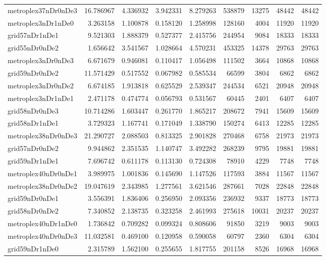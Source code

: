 \begin{longtable}{|l|r|r|r|r|r|r|r|r|}
metroplex37nDr0nDe3 & 16.786967 & 4.336932 & 3.942331 & 8.279263 & 538879 & 13275 & 48442 & 48442 \\
metroplex3nDr1nDe0 & 3.263158 & 1.100878 & 0.158120 & 1.258998 & 128160 & 4004 & 11920 & 11920 \\
grid57nDr1nDe1 & 9.521303 & 1.888379 & 0.527377 & 2.415756 & 244954 & 9084 & 18333 & 18333 \\
grid55nDr0nDe2 & 1.656642 & 3.541567 & 1.028664 & 4.570231 & 453325 & 14378 & 29763 & 29763 \\
metroplex3nDr0nDe3 & 6.671679 & 0.946081 & 0.110417 & 1.056498 & 111502 & 3664 & 10868 & 10868 \\
grid59nDr0nDe2 & 11.571429 & 0.517552 & 0.067982 & 0.585534 & 66599 & 3804 & 6862 & 6862 \\
metroplex3nDr0nDe2 & 6.674185 & 1.913818 & 0.625529 & 2.539347 & 244534 & 6521 & 20948 & 20948 \\
metroplex3nDr1nDe1 & 2.471178 & 0.474774 & 0.056793 & 0.531567 & 60445 & 2401 & 6407 & 6407 \\
grid58nDr0nDe3 & 10.714286 & 1.603447 & 0.261770 & 1.865217 & 208672 & 7941 & 15609 & 15609 \\
grid58nDr1nDe1 & 3.729323 & 1.167741 & 0.171049 & 1.338790 & 150274 & 6413 & 12285 & 12285 \\
metroplex38nDr0nDe3 & 21.290727 & 2.088503 & 0.813325 & 2.901828 & 270468 & 6758 & 21973 & 21973 \\
grid57nDr0nDe2 & 9.944862 & 2.351535 & 1.140747 & 3.492282 & 268239 & 9795 & 19881 & 19881 \\
grid59nDr1nDe1 & 7.696742 & 0.611178 & 0.113130 & 0.724308 & 78910 & 4229 & 7748 & 7748 \\
metroplex40nDr0nDe1 & 3.989975 & 1.001836 & 0.145690 & 1.147526 & 117593 & 3884 & 11567 & 11567 \\
metroplex38nDr0nDe2 & 19.047619 & 2.343985 & 1.277561 & 3.621546 & 287661 & 7028 & 22848 & 22848 \\
grid59nDr0nDe1 & 3.556391 & 1.836406 & 0.256950 & 2.093356 & 236932 & 9337 & 18773 & 18773 \\
grid58nDr0nDe2 & 7.340852 & 2.138735 & 0.323258 & 2.461993 & 275618 & 10031 & 20237 & 20237 \\
metroplex40nDr1nDe0 & 1.736842 & 0.709282 & 0.099324 & 0.808606 & 91850 & 3219 & 9003 & 9003 \\
metroplex40nDr0nDe3 & 11.032581 & 0.469100 & 0.120958 & 0.590058 & 60797 & 2360 & 6304 & 6304 \\
grid59nDr1nDe0 & 2.315789 & 1.562100 & 0.255655 & 1.817755 & 201158 & 8526 & 16968 & 16968 \\

\end{longtable}
